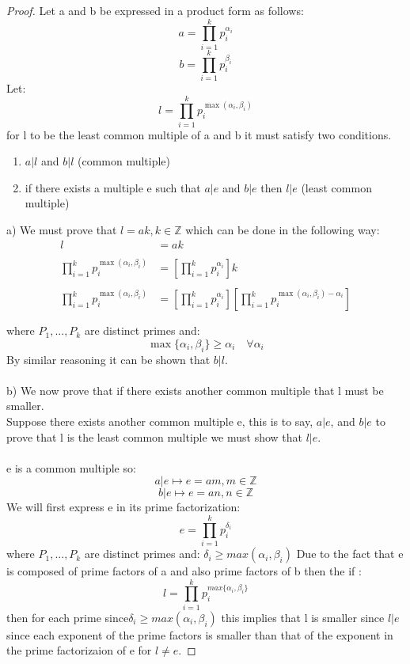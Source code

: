 \documentclass[11pt]{article}
\theoremstyle{definition}  %
\newcommand{\Z}{\mathbb{Z}}
\begin{document}
\begin{enumerate}
\begin{proof}
  Let a and b be expressed in a product form as follows:
  \[
    a=\prod_{i=1}^kp_i^{\alpha_i}
  \]
  \[
    b=\prod_{i=1}^kp_i^{\beta_i}
  \]
  Let:
  \[
    l=\prod_{i=1}^kp_i^{\max(\alpha_i,\beta_i)}
  \]
  for l to be the least common multiple of a and b it must satisfy two conditions.
  \begin{enumerate}
    \item $a|l$ and $b|l$ (common multiple)
    \item if there exists a multiple e such that $a|e$ and $b|e$ then $l|e$ (least common multiple)
  \end{enumerate}
a) We must prove that $l=ak,k\in \Z$ which can be done in the following way:
\begin{align*}
  l&=ak\\\\
  \prod_{i=1}^kp_i^{\max(\alpha_i,\beta_i)}&=\left[\prod_{i=1}^kp_i^{\alpha_i}\right]k\\\\
  \prod_{i=1}^kp_i^{\max(\alpha_i,\beta_i)}&=\left[\prod_{i=1}^kp_i^{\alpha_i}\right]\left[\prod_{i=1}^kp_i^{\max(\alpha_i,\beta_i)-\alpha_i}\right]\\\\
\end{align*}
where $P_1,...,P_k$ are distinct primes and:
 $$\max\{\alpha_i,\beta_i\}\geq \alpha_i \quad \forall \alpha_i$$
By similar reasoning it can be shown that $b|l$.\\\\
b) We now prove that if there exists another common multiple that l must be smaller.\\
Suppose there exists another common multiple e, this is to say, $a|e$, and $b|e$ to prove that l is the least common multiple we must show that $l|e$.\\\\
e is a common multiple so:
\[
  a|e\mapsto e=am,m\in \Z
\]
\[
  b|e\mapsto e=an,n\in \Z
\]
We will first express e in its prime factorization:
\[
  e=\prod_{i=1}^kp_i^{\delta_i}
\]
where $P_1,...,P_k$ are distinct primes and:
$\delta_i\geq max(\alpha_i,\beta_i)$
Due to the fact that e is composed of prime factors of a and also prime factors of b then the if :
\[
  l=\prod_{i=1}^kp_i^{max\{\alpha_i,\beta_i\}}
\]
then for each prime since$\delta_i\geq max(\alpha_i,\beta_i)$ this implies that l is smaller since $l|e$ since each exponent of the prime factors is smaller than that of the exponent in the prime factorizaion of e for $l\neq e$.
\end{proof}
 \end{enumerate}
\end{document}
